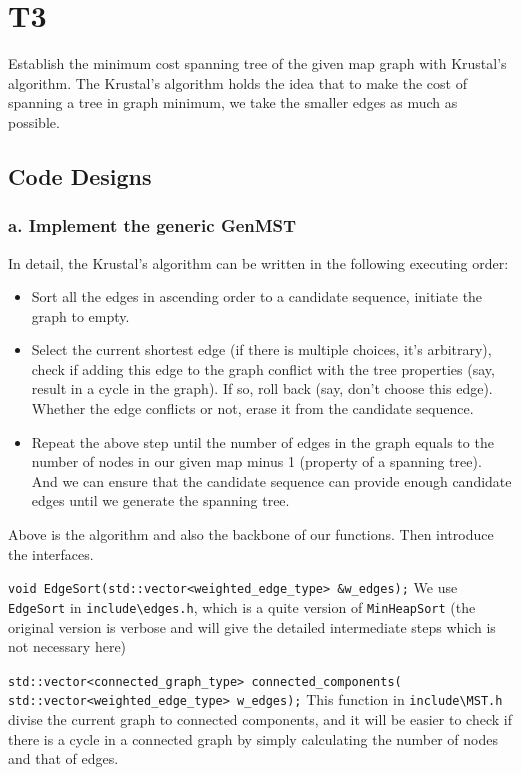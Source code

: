 \section{T3}

Establish the minimum cost spanning tree of the given map graph with Krustal's algorithm. The Krustal's algorithm holds the idea that to make the cost of spanning a tree in graph minimum, we take the smaller edges as much as possible.

\subsection{Code Designs}
\subsubsection*{a. Implement the generic \textbf{GenMST}}
In detail, the Krustal's algorithm can be written in the following executing order:
\begin{itemize}
    \item Sort all the edges in ascending order to a candidate sequence, initiate the graph to empty.
    \item Select the current shortest edge (if there is multiple choices, it's arbitrary), check if adding this edge to the graph conflict with the tree properties (say, result in a cycle in the graph). If so, roll back (say, don't choose this edge). Whether the edge conflicts or not, erase it from the candidate sequence. 
    \item Repeat the above step until the number of edges in the graph equals to the number of nodes in our given map minus 1 (property of a spanning tree). And we can ensure that the candidate sequence can provide enough candidate edges until we generate the spanning tree.
\end{itemize}

Above is the algorithm and also the backbone of our functions. Then introduce the interfaces.

\texttt{void EdgeSort(std::vector<weighted_edge_type> &w_edges);} \newline
We use \verb|EdgeSort| in \verb|include\edges.h|, which is a quite version of \verb|MinHeapSort| (the original version is verbose and will give the detailed intermediate steps which is not necessary here)

\texttt{std::vector<connected_graph_type> connected_components(}\newline
\texttt{                     std::vector<weighted_edge_type> w_edges);}\newline
This function in \verb|include\MST.h| divise the current graph to connected components, and it will be easier to check if there is a cycle in a connected graph by simply calculating the number of nodes and that of edges.

